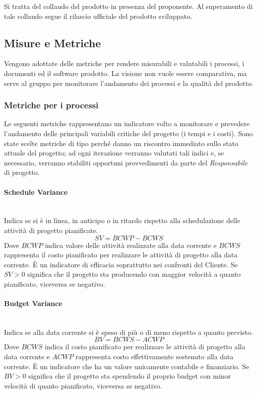 			Si tratta del collaudo del prodotto in presenza del proponente. Al superamento di tale collaudo segue il rilascio ufficiale del prodotto sviluppato.
			
	
	\subsection{Misure e Metriche}
	\label{MisureMetriche}
	
	Vengono adottate delle metriche per rendere misurabili e valutabili i processi, i documenti ed il software prodotto. La visione non vuole essere comparativa, ma serve al gruppo per monitorare l'andamento dei processi e la qualità del prodotto.
		
		\subsubsection{Metriche per i processi}
		Le seguenti metriche rappresentano un indicatore volto a monitorare e prevedere l'andamento delle principali variabili critiche del progetto (i tempi e i costi). Sono state scelte metriche di tipo  perché danno un riscontro immediato sullo stato attuale del progetto; ad ogni iterazione verranno valutati tali indici e, se necessario, verranno stabiliti opportuni provvedimenti da parte del \emph{Responsabile} di progetto.
		
			\paragraph{Schedule Variance} \mbox{} \\

			Indica se si è in linea, in anticipo o in ritardo rispetto alla schedulazione delle attività di progetto pianificate.
			\[
			SV = BCWP - BCWS
			\]
			Dove $BCWP$ indica valore delle attività realizzate alla data corrente e $BCWS$ rappresenta il costo pianificato per realizzare le attività di progetto alla data corrente. 
			È un indicatore di efficacia soprattutto nei confronti del Cliente. Se $SV>0$ significa che il progetto sta producendo con maggior velocità a quanto pianificato, viceversa se negativo.
			
			\paragraph{Budget Variance}\mbox{} \\
			
			Indica se alla data corrente si è speso di più o di meno rispetto a quanto previsto.
			\[
			BV = BCWS - ACWP
			\]
			Dove $BCWS$ indica il costo pianificato per realizzare le attività di  progetto alla  data corrente e $ACWP$ rappresenta costo effettivamente sostenuto alla data  corrente.
			È un indicatore che ha un valore unicamente contabile e finanziario. Se $BV>0$ significa che il progetto sta spendendo il proprio budget con minor velocità di quanto pianificato, viceversa se negativo. 

